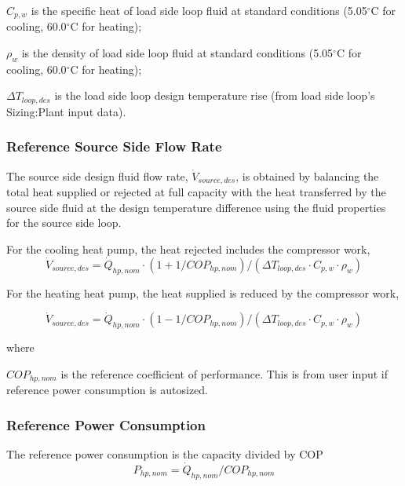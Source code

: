 \( C_{p,w} \) is the specific heat of load side loop fluid at standard conditions (5.05\(^{\circ}\)C for cooling, 60.0\(^{\circ}\)C for heating);

\( \rho_w \) is the density of load side loop fluid at standard conditions (5.05\(^{\circ}\)C for cooling, 60.0\(^{\circ}\)C for heating);

\( \Delta T_{loop,des} \) is the load side loop design temperature rise (from load side loop's Sizing:Plant input data).

\subsubsection{Reference Source Side Flow Rate}\label{WWHP-ref-source-side-flow-rate}

The source side design fluid flow rate, \( \dot V_{source,des} \), is obtained by balancing the total heat supplied or rejected at full capacity with the heat transferred by the source side fluid at the design temperature difference using the fluid properties for the source side loop.

For the cooling heat pump, the heat rejected includes the compressor work,
\begin{equation}
\dot V_{source,des} = \dot Q_{hp,nom} \cdot (1 + 1/COP_{hp,nom})/(\Delta T_{loop,des} \cdot C_{p,w} \cdot \rho_w)
\end{equation}

For the heating heat pump, the heat supplied is reduced by the compressor work,

\begin{equation}
\dot V_{source,des} = \dot Q_{hp,nom} \cdot (1 - 1/COP_{hp,nom})/(\Delta T_{loop,des} \cdot C_{p,w} \cdot \rho_w)
\end{equation}

where

\( COP_{hp,nom} \) is the reference coefficient of performance.  This is from user input if reference power consumption is autosized.

\subsubsection{Reference Power Consumption}\label{wwhp-ref-power-consumption}

The reference power consumption is the capacity divided by COP
\begin{equation}
P_{hp,nom} = \dot Q_{hp,nom} / COP_{hp,nom}
\end{equation}

